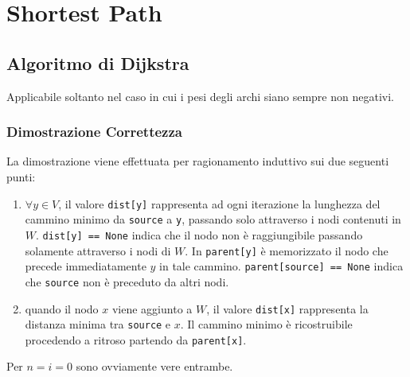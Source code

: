 \documentclass[../template]{subfiles}
\begin{document}
\section{Shortest Path}
\subsection{Algoritmo di Dijkstra}
Applicabile soltanto nel caso in cui i pesi degli archi siano sempre non negativi.

\begin{center}
\end{center}

\subsubsection{Dimostrazione Correttezza}
La dimostrazione viene effettuata per ragionamento induttivo sui due seguenti punti:
\begin{enumerate}
    \item $\forall y \in V$, il valore \lstinline{dist[y]} rappresenta ad ogni iterazione la lunghezza
        del cammino minimo da \lstinline{source} a \lstinline{y}, passando solo attraverso i nodi contenuti in  $W$.
        \lstinline{dist[y] == None} indica che il nodo non è raggiungibile passando solamente attraverso i nodi di $W$.
        In \lstinline{parent[y]} è memorizzato il nodo che precede immediatamente $y$ in tale cammino.
        \lstinline{parent[source] == None} indica che \lstinline{source} non è preceduto da altri nodi.

    \item quando il nodo $x$ viene aggiunto a $W$, il valore \lstinline{dist[x]} rappresenta la distanza minima tra
        \lstinline{source} e $x$.  Il cammino minimo è ricostruibile procedendo a ritroso partendo da \lstinline{parent[x]}.
\end{enumerate}
Per $n = i = 0$ sono ovviamente vere entrambe.
\end{document}
